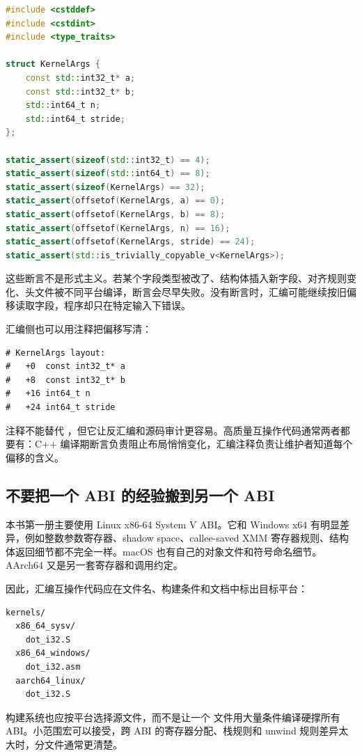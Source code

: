 \begin{lstlisting}[language=C++]
#include <cstddef>
#include <cstdint>
#include <type_traits>

struct KernelArgs {
    const std::int32_t* a;
    const std::int32_t* b;
    std::int64_t n;
    std::int64_t stride;
};

static_assert(sizeof(std::int32_t) == 4);
static_assert(sizeof(std::int64_t) == 8);
static_assert(sizeof(KernelArgs) == 32);
static_assert(offsetof(KernelArgs, a) == 0);
static_assert(offsetof(KernelArgs, b) == 8);
static_assert(offsetof(KernelArgs, n) == 16);
static_assert(offsetof(KernelArgs, stride) == 24);
static_assert(std::is_trivially_copyable_v<KernelArgs>);
\end{lstlisting}

这些断言不是形式主义。若某个字段类型被改了、结构体插入新字段、对齐规则变化、头文件被不同平台编译，断言会尽早失败。没有断言时，汇编可能继续按旧偏移读取字段，程序却只在特定输入下错误。

汇编侧也可以用注释把偏移写清：

\begin{lstlisting}
# KernelArgs layout:
#   +0  const int32_t* a
#   +8  const int32_t* b
#   +16 int64_t n
#   +24 int64_t stride
\end{lstlisting}

注释不能替代 ，但它让反汇编和源码审计更容易。高质量互操作代码通常两者都要有：C++ 编译期断言负责阻止布局悄悄变化，汇编注释负责让维护者知道每个偏移的含义。

\subsection{不要把一个 ABI 的经验搬到另一个 ABI}

本书第一册主要使用 Linux x86-64 System V ABI。它和 Windows x64 有明显差异，例如整数参数寄存器、shadow space、callee-saved XMM 寄存器规则、结构体返回细节都不完全一样。macOS 也有自己的对象文件和符号命名细节。AArch64 又是另一套寄存器和调用约定。

因此，汇编互操作代码应在文件名、构建条件和文档中标出目标平台：

\begin{lstlisting}
kernels/
  x86_64_sysv/
    dot_i32.S
  x86_64_windows/
    dot_i32.asm
  aarch64_linux/
    dot_i32.S
\end{lstlisting}

构建系统也应按平台选择源文件，而不是让一个  文件用大量条件编译硬撑所有 ABI。小范围宏可以接受，跨 ABI 的寄存器分配、栈规则和 unwind 规则差异太大时，分文件通常更清楚。

